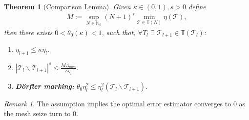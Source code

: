 \documentclass[a4paper,12pt,oneside,fleqn]{book}
\newtheorem{theorem}{Theorem}[section]
\theoremstyle{definition}
\theoremstyle{remark}
\newtheorem*{remark}{Remark}
\begin{document}
\begin{theorem}[Comparison Lemma]
Given $ \kappa \in (0, 1), s > 0$ define
\begin{align*}
	M:= \sup_{N \in \mathbb{N}_0} (N + 1)^{s} \min_{\mathcal{T} \in \mathbb{T}(N)} \eta(\mathcal{T}),
\end{align*}
then there exists $0 < \theta_0(\kappa) < 1$, such that, $\forall T_l$ $\exists$ $\mathcal{T}_{l+1} \in \mathbb{T}(\mathcal{T}_l)$:
\begin{enumerate}
	\item $\eta_{l + 1} \le \kappa \eta_l$. 
	\item $ |\mathcal{T}_l \backslash \mathcal{T}_{l + 1}|^s \le \frac{ M \Lambda_{mon}}{\kappa\eta_l}.$
	\item \textbf{D\"orfler marking: } $\theta_0 \eta_l^2 \le \eta^2_l(\mathcal{T}_l \backslash \mathcal{T}_{l + 1}).$
\end{enumerate}	
\end{theorem}
\begin{remark}
The assumption implies the optimal error estimator converges to 0 as the mesh seize turn to 0. 
\end{remark}
\end{document}
